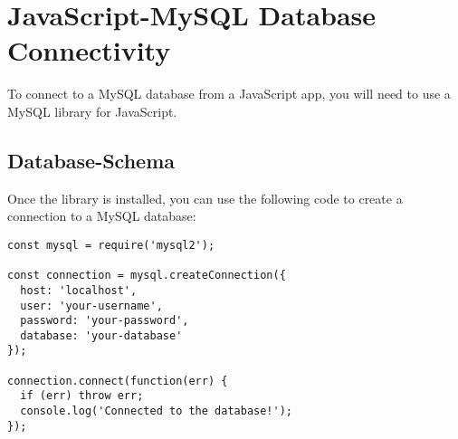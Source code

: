 \chapter{JavaScript-MySQL Database Connectivity}
To connect to a MySQL database from a JavaScript app, you will need to use a MySQL library for JavaScript.\\

\section{Database-Schema}
Once the library is installed, you can use the following code to create a connection to a MySQL database:\\
\begin{verbatim}
const mysql = require('mysql2');

const connection = mysql.createConnection({
  host: 'localhost',
  user: 'your-username',
  password: 'your-password',
  database: 'your-database'
});

connection.connect(function(err) {
  if (err) throw err;
  console.log('Connected to the database!');
});

\end{verbatim}


